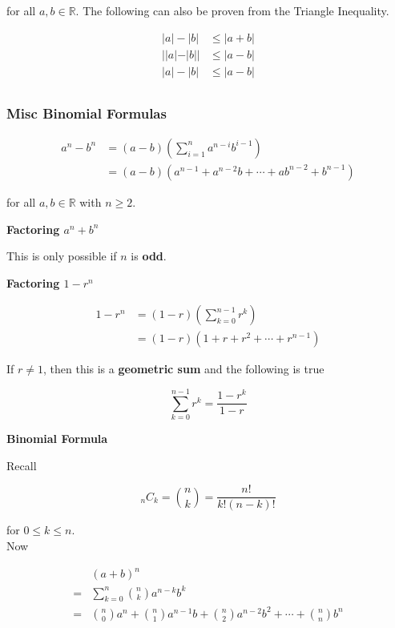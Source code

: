 \documentclass[12pt,letterpaper]{article}
\newcommand{\R}{{\mathbb R}}
\begin{document}
\begin{multicols*}{2}
        for all $a, b \in \R$. The following can also be proven from the
        Triangle Inequality.

        \begin{align*}
            |a| - |b| &\leq |a + b| \\
            ||a| - |b|| &\leq |a - b| \\
            |a| - |b| &\leq |a - b| \\
        \end{align*}

        \subsubsection{Misc Binomial Formulas}

        \begin{align*}
            a^n - b^n &= (a - b)\left( \sum_{i = 1}^{n} a^{n - i}b^{i - 1} \right) \\
                      &= (a - b)\left( a^{n - 1} + a^{n - 2}b + \cdots + ab^{n - 2} + b^{n - 1} \right)
        \end{align*}
        
        for all $a, b \in \R$ with $n \geq 2$.

        {\bf Factoring $a^n + b^n$}

        This is only possible if $n$ is {\bf odd}.

        {\bf Factoring $1 - r^n$}

        \begin{align*}
            1 - r^n &= (1 - r)\left( \sum_{k = 0}^{n - 1} r^k \right) \\
                    &= (1 - r)\left( 1 + r + r^2 + \cdots + r^{n - 1} \right)
        \end{align*}
        
        If $r \neq 1$, then this is a {\bf geometric sum} and the following is true

        \[
            \sum_{k = 0}^{n - 1} r^k = \frac{1 - r^k}{1 - r}
        \]

        {\bf Binomial Formula}

        Recall

        \[
            {}_nC_k = \binom{n}{k} = \frac{n!}{k!(n - k)!}
        \]

        for $0 \leq k \leq n$. \\

        Now

        \begin{align*}
             &(a + b)^n \\
            =&\sum_{k = 0}^{n} \binom{n}{k} a^{n - k}b^{k} \\
            =&\binom{n}{0}a^n + \binom{n}{1}a^{n - 1}b + \binom{n}{2}a^{n - 2}b^2 + \cdots + \binom{n}{n}b^n \\ 
        \end{align*}


\end{multicols*}
\end{document}

